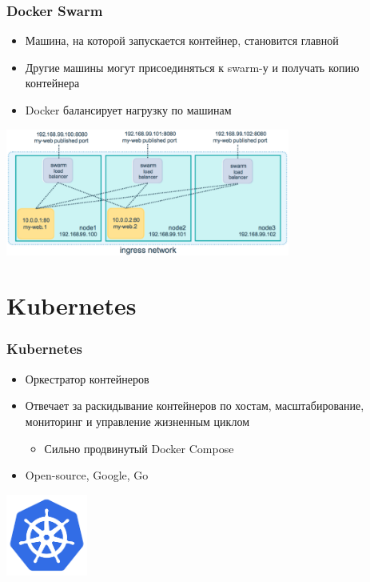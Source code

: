 \documentclass{../../slides-style}
\begin{document}
    \begin{frame}
        \frametitle{Docker Swarm}
        \begin{itemize}
            \item Машина, на которой запускается контейнер, становится главной
            \item Другие машины могут присоединяться к swarm-у и получать копию контейнера
            \item Docker балансирует нагрузку по машинам
        \end{itemize}
        \begin{center}
            \includegraphics[width=0.7\textwidth]{swarmLoadBalancing.png}
        \end{center}
    \end{frame}

    \section{Kubernetes}


    \begin{frame}
        \frametitle{Kubernetes}
        \begin{itemize}
            \item Оркестратор контейнеров
            \item Отвечает за раскидывание контейнеров по хостам, масштабирование, мониторинг и управление жизненным циклом
            \begin{itemize}
                \item Сильно продвинутый Docker Compose
            \end{itemize}
            \item Open-source, Google, Go
        \end{itemize}
        \begin{flushright}
            \includegraphics[width=0.2\textwidth]{kubernetes.png}
            \hspace{1cm}
        \end{flushright}
    \end{frame}
\end{document}

